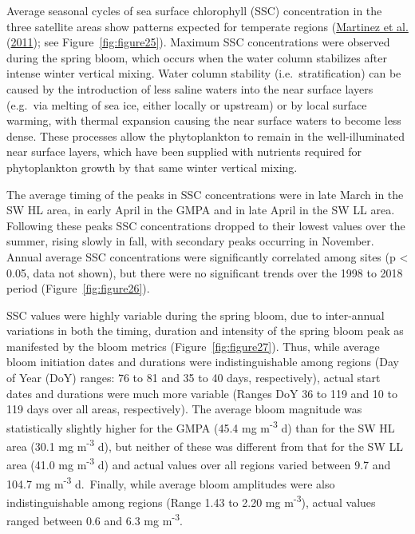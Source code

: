 \documentclass[12pt]{article}\usepackage[]{graphicx}\usepackage[]{color}
\begin{document}
Average seasonal cycles of sea surface chlorophyll (SSC) concentration in the three satellite areas show patterns expected for temperate regions (\protect\hyperlink{ref-martinez_2011}{Martinez et al.} (\protect\hyperlink{ref-martinez_2011}{2011}); see Figure~\ref{fig:figure25}). Maximum SSC concentrations were observed during the spring bloom, which occurs when the water column stabilizes after intense winter vertical mixing. Water column stability (i.e.~stratification) can be caused by the introduction of less saline waters into the near surface layers (e.g.~via melting of sea ice, either locally or upstream) or by local surface warming, with thermal expansion causing the near surface waters to become less dense. These processes allow the phytoplankton to remain in the well-illuminated near surface layers, which have been supplied with nutrients required for phytoplankton growth by that same winter vertical mixing.

The average timing of the peaks in SSC concentrations were in late March in the SW HL area, in early April in the GMPA and in late April in the SW LL area. Following these peaks SSC concentrations dropped to their lowest values over the summer, rising slowly in fall, with secondary peaks occurring in November. Annual average SSC concentrations were significantly correlated among sites (p \textless{} 0.05, data not shown), but there were no significant trends over the 1998 to 2018 period (Figure~\ref{fig:figure26}).

SSC values were highly variable during the spring bloom, due to inter-annual variations in both the timing, duration and intensity of the spring bloom peak as manifested by the bloom metrics (Figure~\ref{fig:figure27}). Thus, while average bloom initiation dates and durations were indistinguishable among regions (Day of Year (DoY) ranges: 76 to 81 and 35 to 40 days, respectively), actual start dates and durations were much more variable (Ranges DoY 36 to 119 and 10 to 119 days over all areas, respectively). The average bloom magnitude was statistically slightly higher for the GMPA (45.4 mg m\textsuperscript{-3} d) than for the SW HL area (30.1 mg m\textsuperscript{-3} d), but neither of these was different from that for the SW LL area (41.0 mg m\textsuperscript{-3} d) and actual values over all regions varied between 9.7 and 104.7 mg m\textsuperscript{-3} d.~Finally, while average bloom amplitudes were also indistinguishable among regions (Range 1.43 to 2.20 mg m\textsuperscript{-3}), actual values ranged between 0.6 and 6.3 mg m\textsuperscript{-3}.
\end{document}
